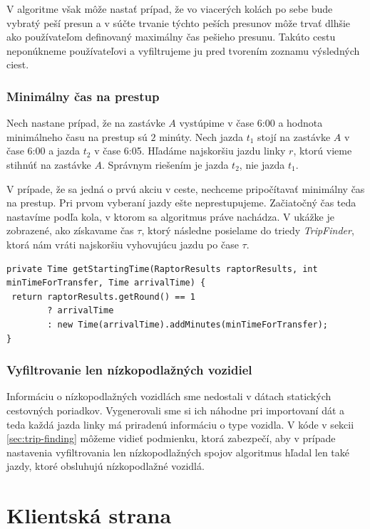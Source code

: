 V algoritme však môže nastať prípad, že vo viacerých kolách po sebe bude vybratý peší presun a v súčte trvanie týchto peších presunov môže trvať dlhšie ako používateľom definovaný maximálny čas pešieho presunu.
Takúto cestu neponúkneme používateľovi a vyfiltrujeme ju pred tvorením zoznamu výsledných ciest.

\subsubsection{Minimálny čas na prestup}
Nech nastane prípad, že na zastávke $A$ vystúpime v čase 6:00 a hodnota minimálneho času na prestup sú $2$ minúty. Nech jazda $t_1$ stojí na zastávke $A$ v čase 6:00 a jazda $t_2$ v čase 6:05. Hľadáme najskoršiu jazdu linky $r$, ktorú vieme stihnúť na zastávke $A$. Správnym riešením je jazda $t_2$, nie jazda $t_1$.

V prípade, že sa jedná o prvú akciu v ceste, nechceme pripočítavať minimálny čas na prestup. Pri prvom vyberaní jazdy ešte neprestupujeme. Začiatočný čas teda nastavíme podľa kola, v ktorom sa algoritmus práve nachádza. V ukážke je zobrazené, ako získavame čas $\tau$, ktorý následne posielame do triedy \textit{TripFinder}, ktorá nám vráti najskoršiu vyhovujúcu jazdu po čase $\tau$.
\begin{lstlisting}
private Time getStartingTime(RaptorResults raptorResults, int minTimeForTransfer, Time arrivalTime) {
 return raptorResults.getRound() == 1
        ? arrivalTime
        : new Time(arrivalTime).addMinutes(minTimeForTransfer);
}
\end{lstlisting} 

\subsubsection{Vyfiltrovanie len nízkopodlažných vozidiel}
Informáciu o nízkopodlažných vozidlách sme nedostali v dátach statických cestovných poriadkov. Vygenerovali sme si ich náhodne pri importovaní dát a teda každá jazda linky má priradenú informáciu o type vozidla.
V kóde v sekcii \ref{sec:trip-finding} môžeme vidieť podmienku, ktorá zabezpečí, aby v prípade nastavenia vyfiltrovania len nízkopodlažných spojov algoritmus hľadal len také jazdy, ktoré obsluhujú nízkopodlažné vozidlá.

\section{Klientská strana} 



